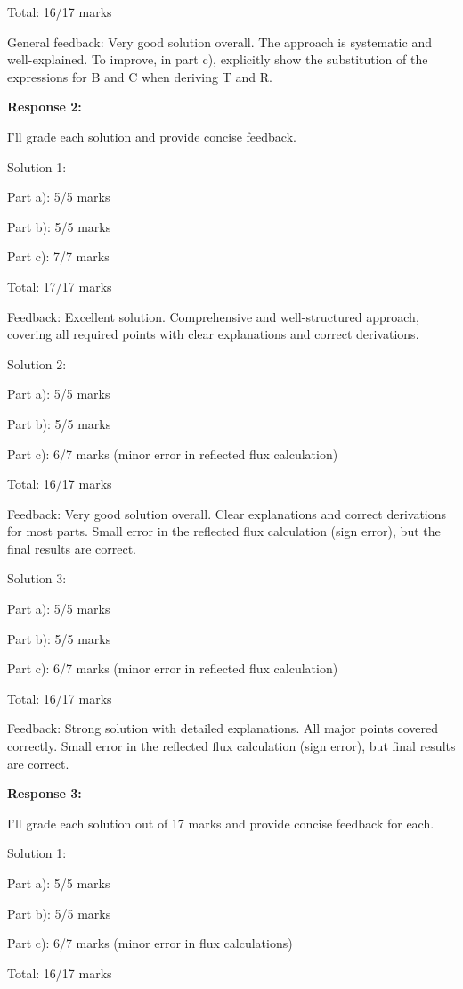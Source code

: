 \documentclass[a4paper,11pt]{article}
\begin{document}
Total: 16/17 marks

General feedback: Very good solution overall. The approach is systematic and well-explained. To improve, in part c), explicitly show the substitution of the expressions for B and C when deriving T and R.

\bigskip   
\textbf{Response 2:}

I'll grade each solution and provide concise feedback.

Solution 1:

Part a): 5/5 marks

Part b): 5/5 marks

Part c): 7/7 marks

Total: 17/17 marks

Feedback: Excellent solution. Comprehensive and well-structured approach, covering all required points with clear explanations and correct derivations.

Solution 2:

Part a): 5/5 marks

Part b): 5/5 marks

Part c): 6/7 marks (minor error in reflected flux calculation)

Total: 16/17 marks

Feedback: Very good solution overall. Clear explanations and correct derivations for most parts. Small error in the reflected flux calculation (sign error), but the final results are correct.

Solution 3:

Part a): 5/5 marks

Part b): 5/5 marks

Part c): 6/7 marks (minor error in reflected flux calculation)

Total: 16/17 marks

Feedback: Strong solution with detailed explanations. All major points covered correctly. Small error in the reflected flux calculation (sign error), but final results are correct.

\bigskip   
\textbf{Response 3:}

I'll grade each solution out of 17 marks and provide concise feedback for each.

Solution 1:

Part a): 5/5 marks

Part b): 5/5 marks

Part c): 6/7 marks (minor error in flux calculations)

Total: 16/17 marks
\end{document}
